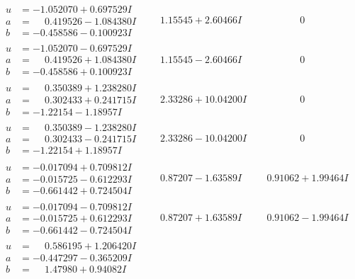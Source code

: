 \documentclass[1p]{elsarticle_modified}
\theoremstyle{definition}
\begin{document}
$$\begin{array}{c|c|c}
\begin{aligned}
u &= -1.052070 + 0.697529 I \\
a &= \phantom{-}0.419526 - 1.084380 I \\
b &= -0.458586 - 0.100923 I\end{aligned}
 & \phantom{-}1.15545 + 2.60466 I & \phantom{-0.000000 } 0 \\ \hline\begin{aligned}
u &= -1.052070 - 0.697529 I \\
a &= \phantom{-}0.419526 + 1.084380 I \\
b &= -0.458586 + 0.100923 I\end{aligned}
 & \phantom{-}1.15545 - 2.60466 I & \phantom{-0.000000 } 0 \\ \hline\begin{aligned}
u &= \phantom{-}0.350389 + 1.238280 I \\
a &= \phantom{-}0.302433 + 0.241715 I \\
b &= -1.22154 - 1.18957 I\end{aligned}
 & \phantom{-}2.33286 + 10.04200 I & \phantom{-0.000000 } 0 \\ \hline\begin{aligned}
u &= \phantom{-}0.350389 - 1.238280 I \\
a &= \phantom{-}0.302433 - 0.241715 I \\
b &= -1.22154 + 1.18957 I\end{aligned}
 & \phantom{-}2.33286 - 10.04200 I & \phantom{-0.000000 } 0 \\ \hline\begin{aligned}
u &= -0.017094 + 0.709812 I \\
a &= -0.015725 - 0.612293 I \\
b &= -0.661442 + 0.724504 I\end{aligned}
 & \phantom{-}0.87207 - 1.63589 I & \phantom{-}0.91062 + 1.99464 I \\ \hline\begin{aligned}
u &= -0.017094 - 0.709812 I \\
a &= -0.015725 + 0.612293 I \\
b &= -0.661442 - 0.724504 I\end{aligned}
 & \phantom{-}0.87207 + 1.63589 I & \phantom{-}0.91062 - 1.99464 I \\ \hline\begin{aligned}
u &= \phantom{-}0.586195 + 1.206420 I \\
a &= -0.447297 - 0.365209 I \\
b &= \phantom{-}1.47980 + 0.94082 I\end{aligned}

\end{array}$$
\end{document}
